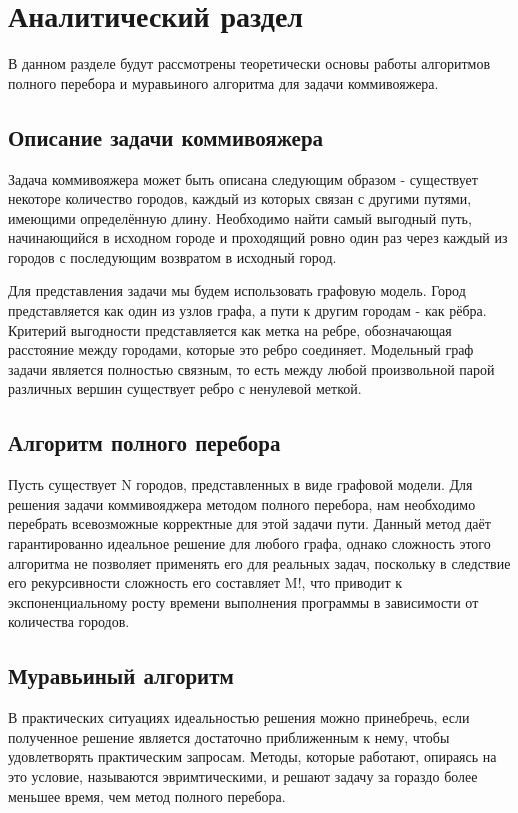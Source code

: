 \chapter{Аналитический раздел}
В данном разделе будут рассмотрены теоретически основы работы алгоритмов полного перебора и муравьиного алгоритма для задачи коммивояжера.

\section{Описание задачи коммивояжера}
Задача коммивояжера может быть описана следующим образом - существует некоторе количество городов, каждый из которых связан с другими путями, имеющими определённую длину. Необходимо найти самый выгодный путь, начинающийся в исходном городе и проходящий ровно один раз через каждый из городов с последующим возвратом в исходный город.

Для представления задачи мы будем использовать графовую модель. Город представляется как один из узлов графа, а пути к другим городам - как рёбра. Критерий выгодности представляется как метка на ребре, обозначающая расстояние между городами, которые это ребро соединяет. Модельный граф задачи является полностью связным, то есть между любой произвольной парой различных вершин существует ребро с ненулевой меткой.

\section{Алгоритм полного перебора}
Пусть существует N городов, представленных в виде графовой модели. Для решения задачи коммивояджера методом полного перебора, нам необходимо перебрать всевозможные корректные для этой задачи пути. Данный метод даёт гарантированно идеальное решение для любого графа, однако сложность этого алгоритма не позволяет применять его для реальных задач, поскольку в следствие его рекурсивности сложность его составляет M!, что приводит к экспоненциальному росту времени выполнения программы в зависимости от количества городов.

\section{Муравьиный алгоритм}
В практических ситуациях идеальностью решения можно принебречь, если полученное решение является достаточно приближенным к нему, чтобы удовлетворять практическим запросам. Методы, которые работают, опираясь на это условие, называются эвримтическими, и решают задачу за гораздо более меньшее время, чем метод полного перебора. 

